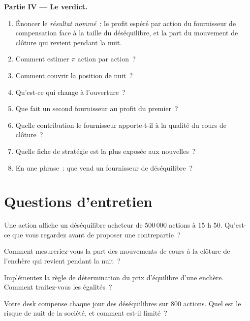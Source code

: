 \begin{problem}
\medskip\noindent\textbf{Partie IV --- Le verdict.}
\begin{enumerate}[resume]
\item Énoncer le \emph{résultat nommé}~: le profit espéré par action du fournisseur de compensation face à la taille du déséquilibre, et la part du
mouvement de clôture qui revient pendant la nuit.
\item Comment estimer $\pi$ action par action~?
\item Comment couvrir la position de nuit~?
\item Qu'est-ce qui change à l'ouverture~?
\item Que fait un second fournisseur au profit du premier~?
\item Quelle contribution le fournisseur apporte-t-il à la qualité du cours de clôture~?
\item Quelle fiche de stratégie est la plus exposée aux nouvelles~?
\item En une phrase~: que vend un fournisseur de déséquilibre~?
\end{enumerate}
\end{problem}

\section{Questions d'entretien}

\begin{interviewq}\label{iq:hf:auctions-and-the-close:1}
Une action affiche un déséquilibre acheteur de 500\,000 actions à 15 h 50. Qu'est-ce que vous regardez avant de proposer une contrepartie~?
\end{interviewq}

\begin{interviewq}\label{iq:hf:auctions-and-the-close:2}
Comment mesureriez-vous la part des mouvements de cours à la clôture de l'enchère qui revient pendant la nuit~?
\end{interviewq}

\begin{interviewq}\label{iq:hf:auctions-and-the-close:3}
Implémentez la règle de détermination du prix d'équilibre d'une enchère. Comment traitez-vous les égalités~?
\end{interviewq}

\begin{interviewq}\label{iq:hf:auctions-and-the-close:4}
Votre desk compense chaque jour des déséquilibres sur 800 actions. Quel est le risque de nuit de la société, et comment est-il limité~?
\end{interviewq}

